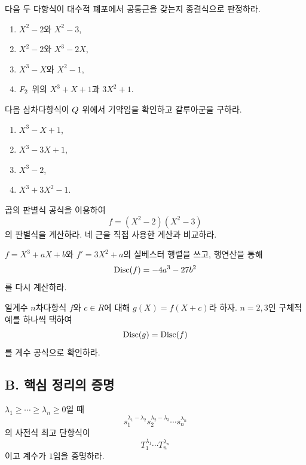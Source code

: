 \begin{exercise}[*]
다음 두 다항식이 대수적 폐포에서 공통근을 갖는지 종결식으로 판정하라.
\begin{enumerate}[label=(\alph*)]
  \item $X^2-2$와 $X^2-3$,
  \item $X^2-2$와 $X^3-2X$,
  \item $X^3-X$와 $X^2-1$,
  \item $F_2$ 위의 $X^3+X+1$과 $3X^2+1$.
\end{enumerate}
\end{exercise}

\begin{exercise}[*]
다음 삼차다항식이 $Q$ 위에서 기약임을 확인하고 갈루아군을 구하라.
\begin{enumerate}[label=(\alph*)]
  \item $X^3-X+1$,
  \item $X^3-3X+1$,
  \item $X^3-2$,
  \item $X^3+3X^2-1$.
\end{enumerate}
\end{exercise}

\begin{exercise}
곱의 판별식 공식을 이용하여
\[
  f=(X^2-2)(X^2-3)
\]
의 판별식을 계산하라. 네 근을 직접 사용한 계산과 비교하라.
\end{exercise}

\begin{exercise}
$f=X^3+aX+b$와 $f'=3X^2+a$의 실베스터 행렬을 쓰고, 행연산을 통해
\[
  \operatorname{Disc}(f)=-4a^3-27b^2
\]
를 다시 계산하라.
\end{exercise}

\begin{exercise}
일계수 $n$차다항식 $f$와 $c\in R$에 대해 $g(X)=f(X+c)$라 하자. $n=2,3$인 구체적 예를 하나씩 택하여
\[
  \operatorname{Disc}(g)=\operatorname{Disc}(f)
\]
를 계수 공식으로 확인하라.
\end{exercise}

\subsection*{B. 핵심 정리의 증명}

\begin{exercise}[*]
$\lambda_1\ge\cdots\ge\lambda_n\ge0$일 때
\[
  s_1^{\lambda_1-\lambda_2}
  s_2^{\lambda_2-\lambda_3}\cdots s_n^{\lambda_n}
\]
의 사전식 최고 단항식이
\[
  T_1^{\lambda_1}\cdots T_n^{\lambda_n}
\]
이고 계수가 $1$임을 증명하라.
\end{exercise}

